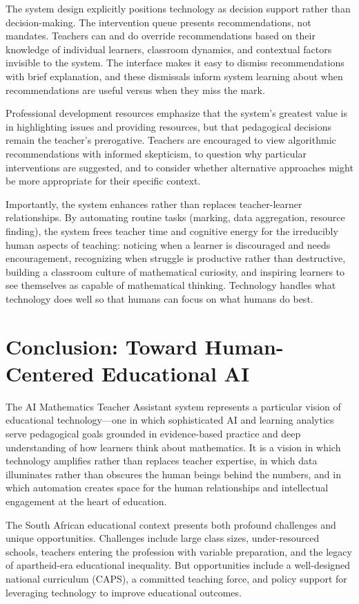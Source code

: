 \documentclass[12pt,a4paper]{article}
\begin{document}
The system design explicitly positions technology as decision support rather than decision-making. The intervention queue presents recommendations, not mandates. Teachers can and do override recommendations based on their knowledge of individual learners, classroom dynamics, and contextual factors invisible to the system. The interface makes it easy to dismiss recommendations with brief explanation, and these dismissals inform system learning about when recommendations are useful versus when they miss the mark.

Professional development resources emphasize that the system's greatest value is in highlighting issues and providing resources, but that pedagogical decisions remain the teacher's prerogative. Teachers are encouraged to view algorithmic recommendations with informed skepticism, to question why particular interventions are suggested, and to consider whether alternative approaches might be more appropriate for their specific context.

Importantly, the system enhances rather than replaces teacher-learner relationships. By automating routine tasks (marking, data aggregation, resource finding), the system frees teacher time and cognitive energy for the irreducibly human aspects of teaching: noticing when a learner is discouraged and needs encouragement, recognizing when struggle is productive rather than destructive, building a classroom culture of mathematical curiosity, and inspiring learners to see themselves as capable of mathematical thinking. Technology handles what technology does well so that humans can focus on what humans do best.

\section{Conclusion: Toward Human-Centered Educational AI}

The AI Mathematics Teacher Assistant system represents a particular vision of educational technology---one in which sophisticated AI and learning analytics serve pedagogical goals grounded in evidence-based practice and deep understanding of how learners think about mathematics. It is a vision in which technology amplifies rather than replaces teacher expertise, in which data illuminates rather than obscures the human beings behind the numbers, and in which automation creates space for the human relationships and intellectual engagement at the heart of education.

The South African educational context presents both profound challenges and unique opportunities. Challenges include large class sizes, under-resourced schools, teachers entering the profession with variable preparation, and the legacy of apartheid-era educational inequality. But opportunities include a well-designed national curriculum (CAPS), a committed teaching force, and policy support for leveraging technology to improve educational outcomes.
\end{document}
